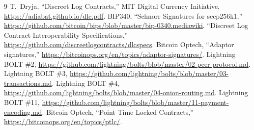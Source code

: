 \documentclass[11pt,a4paper]{article}
\theoremstyle{claimstyle}
\begin{document}
\begin{thebibliography}{9}
 T.\ Dryja, ``Discreet Log Contracts,'' MIT Digital Currency
  Initiative, \url{https://adiabat.github.io/dlc.pdf}.
 BIP340, ``Schnorr Signatures for secp256k1,''
  \url{https://github.com/bitcoin/bips/blob/master/bip-0340.mediawiki}.
 ``Discreet Log Contract Interoperability Specifications,''
  \url{https://github.com/discreetlogcontracts/dlcspecs}.
 Bitcoin Optech, ``Adaptor signatures,''
  \url{https://bitcoinops.org/en/topics/adaptor-signatures/}.
 Lightning BOLT \#2,
  \url{https://github.com/lightning/bolts/blob/master/02-peer-protocol.md}.
 Lightning BOLT \#3,
  \url{https://github.com/lightning/bolts/blob/master/03-transactions.md}.
 Lightning BOLT \#4,
  \url{https://github.com/lightning/bolts/blob/master/04-onion-routing.md}.
 Lightning BOLT \#11,
  \url{https://github.com/lightning/bolts/blob/master/11-payment-encoding.md}.
 Bitcoin Optech, ``Point Time Locked Contracts,''
  \url{https://bitcoinops.org/en/topics/ptlc/}.
\end{thebibliography}
\end{document}

